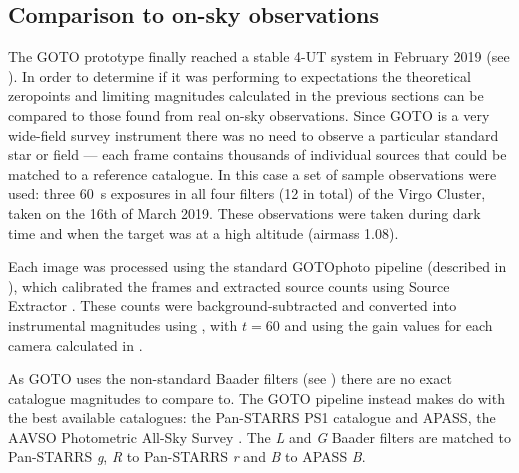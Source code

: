 \begin{colsection}
\begin{colsection}
\end{colsection}

\newpage
\subsection{Comparison to on-sky observations}
\label{sec:onsky_comparison}
\begin{colsection}

The GOTO prototype finally reached a stable 4-UT system in February 2019 (see ). In order to determine if it was performing to expectations the theoretical zeropoints and limiting magnitudes calculated in the previous sections can be compared to those found from real on-sky observations. Since GOTO is a very wide-field survey instrument there was no need to observe a particular standard star or field --- each frame contains thousands of individual sources that could be matched to a reference catalogue. In this case a set of sample observations were used: three \SI{60}{\second} exposures in all four filters (12 in total) of the Virgo Cluster, taken on the 16th of March 2019. These observations were taken during dark time and when the target was at a high altitude (airmass 1.08).

Each image was processed using the standard GOTOphoto pipeline (described in ), which calibrated the frames and extracted source counts using Source Extractor \citep{SE}. These counts were background-subtracted and converted into instrumental magnitudes using , with $t=60$ and using the gain values for each camera calculated in .

As GOTO uses the non-standard Baader filters (see ) there are no exact catalogue magnitudes to compare to. The GOTO pipeline instead makes do with the best available catalogues: the Pan-STARRS PS1 catalogue \citep{Pan-STARRS} and APASS, the AAVSO Photometric All-Sky Survey \citep{APASS}. The \textit{L} and \textit{G} Baader filters are matched to Pan-STARRS \textit{g}, \textit{R} to Pan-STARRS \textit{r} and \textit{B} to APASS \textit{B}.


\end{colsection}
\end{colsection}
